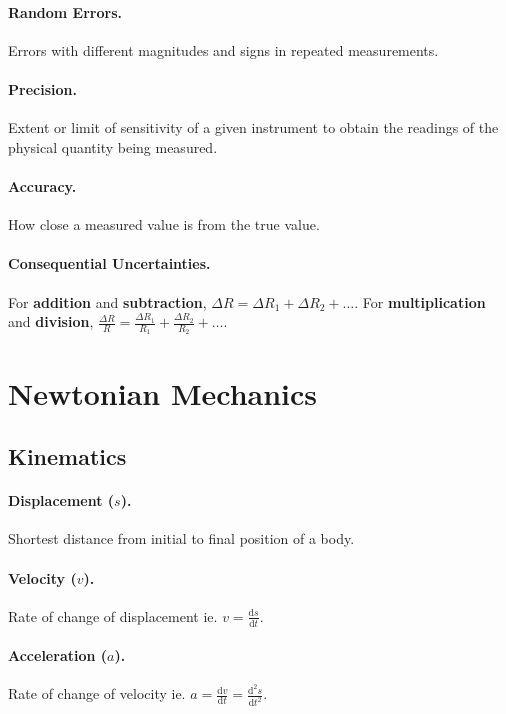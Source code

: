 \documentclass{article}
\begin{document}
\paragraph{Random Errors.} Errors with different magnitudes and signs in repeated measurements.

\paragraph{Precision.} Extent or limit of sensitivity of a given instrument to obtain the readings of the physical quantity being measured.

\paragraph{Accuracy.} How close a measured value is from the true value.

\paragraph{Consequential Uncertainties.} For \textbf{addition} and \textbf{subtraction}, $\Delta R = \Delta R_1 + \Delta R_2 + \ldots$. For \textbf{multiplication} and \textbf{division}, $\frac{\Delta R}{R} = \frac{\Delta R_1}{R_1} + \frac{\Delta R_2}{R_2} + \ldots$.

\section{Newtonian Mechanics}

\subsection{Kinematics}

\paragraph{Displacement ($s$).} Shortest distance from initial to final position of a body.

\paragraph{Velocity ($v$).} Rate of change of displacement ie. $v = \frac{\mathrm{d}s}{\mathrm{d}t}$.

\paragraph{Acceleration ($a$).} Rate of change of velocity ie. $a = \frac{\mathrm{d}v}{\mathrm{d}t} = \frac{\mathrm{d}^2s}{\mathrm{d}t^2}$.
\end{document}
